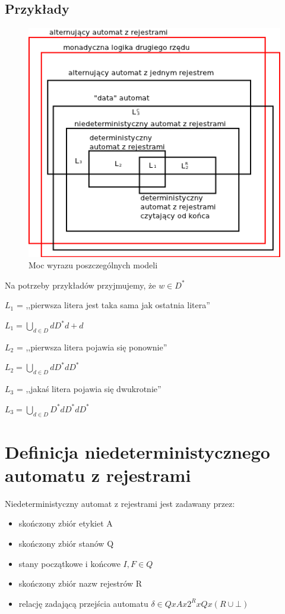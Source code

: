 \documentclass[a4paper,12pt]{report}
\begin{document}
\subsection{Przykłady}
\begin{figure}
\begin{center}
\includegraphics{images/podzial_automatow.png}
\end{center}
\caption{Moc wyrazu poszczególnych modeli}
\end{figure}
Na potrzeby przykładów przyjmujemy, że $ w \in D^* $

$L_1$ = ,,pierwsza litera jest taka sama jak ostatnia litera''

$L_1 = {\bigcup \limits _{d \in D} dD^*d + d}$

$L_2$ = ,,pierwsza litera pojawia się ponownie''

$L_2 = {\bigcup \limits _{d \in D} dD^*dD^*}$

$L_3$ = ,,jakaś litera pojawia się dwukrotnie''

$L_3 = {\bigcup \limits _{d \in D} D^*dD^*dD^*}$

\section {Definicja niedeterministycznego automatu z rejestrami}
Niedeterministyczny automat z rejestrami jest zadawany przez:
\begin{itemize}
\item skończony zbiór etykiet A
\item skończony zbiór stanów Q
\item stany początkowe i końcowe $I,F \in Q$
\item skończony zbiór nazw rejestrów R
\item relację zadającą przejścia automatu $\delta 
\in Q x A x 2^R x Q x (R \cup \bot)$
\end{itemize}
\end{document}
